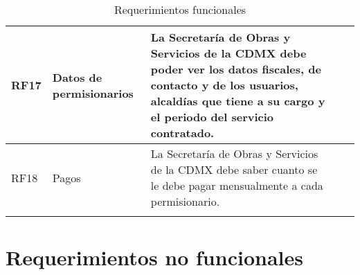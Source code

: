 \begin{longtable}{|m{1.5cm}|m{3cm}|m{5cm}|m{2cm}| m{2cm}|}
        RF17 & Datos de permisionarios &  La Secretaría de Obras y Servicios de la CDMX debe poder ver los datos fiscales, de contacto y de los usuarios, alcaldías que tiene a su cargo y el periodo del servicio contratado.     \\ \hline
        
        RF18 & Pagos & La Secretaría de Obras y Servicios de la CDMX debe saber cuanto se le debe pagar mensualmente a cada permisionario.  \\ \hline
    \caption{Requerimientos funcionales}
    \label{tab:RF}
\end{longtable}

\section{Requerimientos no funcionales}


